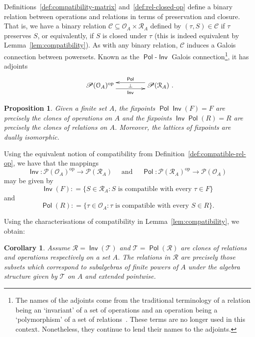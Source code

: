 \documentclass[11pt, a4paper, twoside,leqno]{amsart}
\newcommand{\defeq}{\mathrel{\mathop:}=}
\newcommand{\cd}[2][]{\vcenter{\hbox{\xymatrix#1{#2}}}}
\newcommand{\C}{{\mathcal C}}
\renewcommand{\O}{{\mathcal O}}
\newcommand{\R}{{\mathcal R}}
\numberwithin{equation}{section}
\theoremstyle{plain}
\newtheorem{Prop}[Thm]{Proposition}
\newtheorem{Cor}[Thm]{Corollary}
\theoremstyle{definition}
\DeclareMathOperator{\Pol}{\mathsf{Pol}}
\DeclareMathOperator{\Inv}{\mathsf{Inv}}
\begin{document}
Definitions~\ref{def:compatibility-matrix} and~\ref{def:rel-closed-op}
define a binary relation between operations and relations in terms of
preservation and closure. That is, we have 
a binary relation
\(\C \subseteq \O_{A} \times \R_{A}
\) defined by \((\tau,S) \in \C\) if \(\tau\) preserves \(S\), or
equivalently, if \(S\) is closed under \(\tau\) (this is indeed
equivalent by Lemma~\ref{lem:compatibility}).
As with any binary relation, \(\C\) induces a Galois connection
between powersets. Known as
the \(\Pol\)-\(\Inv\) Galois connection\footnote{The names of the adjoints come from the traditional terminology of a
  relation being an `invariant' of a set of operations and an
  operation being a `polymorphism' of a set of relations~\cite{Kerkhoff:2014aa}. These terms
  are no longer used in this context. Nonetheless, they continue to lend their names to the adjoints. 
}, it has adjoints
\begin{equation*}
  \xymatrixcolsep{3.5pc}
  \xymatrixrowsep{2.5pc}
  \cd{
    {\mathscr{P} (\O_{A})^\mathrm{op}} \ar@<-4.5pt>[r]_-{\Inv} \ar@{<-}@<4.5pt>[r]^-{\Pol} \ar@{}[r]|-{\bot} &
    {\mathscr{P} (\R_{A})
      \rlap{ .}} 
  }
\end{equation*}

\begin{Prop}
  \label{prop:3}
  Given a finite
  set
  \(A\), the fixpoints \(\Pol\Inv(F)=F\) are precisely the clones of
  operations on \(A\) and the fixpoints \(\Inv\Pol(R)=R\) are
  precisely the clones of relations on \(A\). Moreover, the lattices
  of fixpoints are dually isomorphic.  
\end{Prop}

Using the equivalent notion of compatibility from Definition~\ref{def:compatible-rel-op}, we have that the mappings 
\begin{equation*}
  \Inv \colon \mathscr{P} (\O_{A})^{\mathrm{op}}  \rightarrow \mathscr{P} (\R_{A}) \quad \text{ and } \quad \Pol \colon \mathscr{P} (\R_{A})^{\mathrm{op}}
  \rightarrow \mathscr{P} 
  (\O_{A})
\end{equation*}
may be given by 
\begin{equation*}
  \Inv(F) \defeq \{S \in \R_{A} : S  \text{ is compatible with every } \tau \in F\} 
\end{equation*}
and
\begin{equation*}
  \Pol(R) \defeq \{ \tau \in \O_{A} : \tau \text{ is compatible with every } S \in R \}.
\end{equation*}

Using the characterisations of compatibility in Lemma~\ref{lem:compatibility}, we obtain:
\begin{Cor}
  \label{cor:compatibility-clone-coclone}
  Assume \(\mathscr{R}
  = \Inv (\mathscr{T}
  )\) and \(\mathscr{T}
  = \Pol (\mathscr{R}
  )\)
  are clones of relations and operations respectively on a set \(A\).
  The relations in \(\mathscr{R}
  \) are precisely those subsets which
  correspond to subalgebras of finite powers of \(A\) under the algebra
  structure given by \(\mathscr{T}
  \) on \(A\) and extended pointwise.
\end{Cor}
\end{document}
